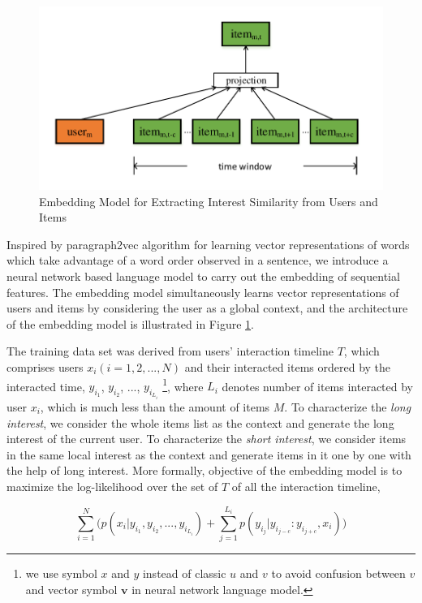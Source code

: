 \documentclass{llncs}
\begin{document}
\begin{figure}[htbp]
	\centering
	\includegraphics[scale=0.45]{images/doc2vec.pdf}
	\caption{Embedding Model for Extracting Interest Similarity from Users and Items}
	\label{fig:doc2vec}
\end{figure}

Inspired by paragraph2vec algorithm \cite{le2014distributed} for learning
vector representations of words which take advantage of a word order observed in a sentence,
we introduce a neural network based language model to carry out the embedding of sequential features.
The embedding model simultaneously learns vector representations of users and items
by considering the user as a global context,
and the architecture of the embedding model is illustrated in Figure \ref{fig:doc2vec}.

The training data set was derived from users' interaction timeline $T$,
which comprises users $x_i (i=1,2,...,N)$ and their interacted items ordered by the interacted time,
$y_{i_1}$, $y_{i_2}$, ..., $y_{i_{L_i}}$
\footnote{we use symbol $x$ and $y$ instead of classic $u$ and $v$ to avoid confusion between $v$
	and vector symbol $\mathbf{v}$ in neural network language model.},
where $L_i$ denotes number of items interacted by user $x_i$,
which is much less than the amount of items $M$.
To characterize the \emph{long interest}, we consider the whole items list as the context and generate
the long interest of the current user.
To characterize the \emph{short interest}, we consider items in the same local interest as the context
and generate items in it one by one with the help of long interest.
More formally, objective of the embedding model is to
maximize the log-likelihood over the set of $T$ of all the interaction timeline,

\begin{equation}
\sum_{i=1}^{N} \bigg( p(x_i | y_{i_1}, y_{i_2}, ..., y_{i_{L_i}}) +
\sum_{j=1}^{L_i} p(y_{i_j} | y_{i_{j-c}} : y_{i_{j+c}}, x_i) \bigg)
\end{equation}
\end{document}
